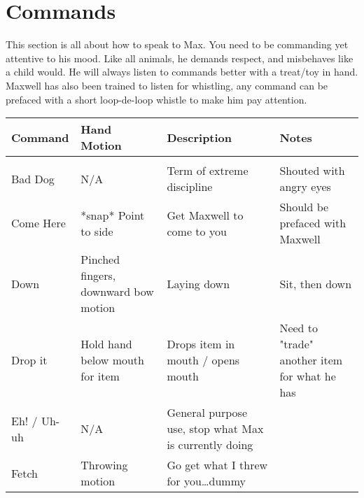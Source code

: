 \documentclass[pdftex,12pt]{article}
\begin{document}
\newpage
\section{Commands}

This section is all about how to speak to Max. You need to be commanding yet
attentive to his mood. Like all animals, he demands respect, and misbehaves like
a child would. He will always listen to commands better with a treat/toy in
hand. Maxwell has also been trained to listen for whistling, any command can be
prefaced with a short loop-de-loop whistle to make him pay attention.

\begin{table}[H]
\begin{adjustwidth}{-3.5cm}{-3.5cm}
\begin{center}
    \begin{tabular}{lp{11em}p{11em}p{11em}}
        Command     & Hand Motion                                      &
        Description                                           & Notes
        \\ \hline \\
        Bad Dog     & N/A                                              & Term of extreme discipline                            & Shouted with angry eyes                                            \\
        Come Here   & *snap* Point to side                             & Get Maxwell to come to you                            & Should be prefaced with Maxwell                                    \\
        Down        & Pinched fingers, downward bow motion             & Laying down                                           & Sit, then down                                                     \\
        Drop it     & Hold hand below mouth for item                   & Drops item in mouth / opens mouth                     & Need to "trade" another item for what he has                       \\
        Eh! / Uh-uh & N/A                                              & General purpose use, stop what Max is currently doing &                                                                    \\
        Fetch       & Throwing motion                                  & Go get
        what I threw for you\ldots dummy                   &                                                                    \\

\end{tabular}
\end{center}
\end{adjustwidth}
\end{table}
\end{document}

